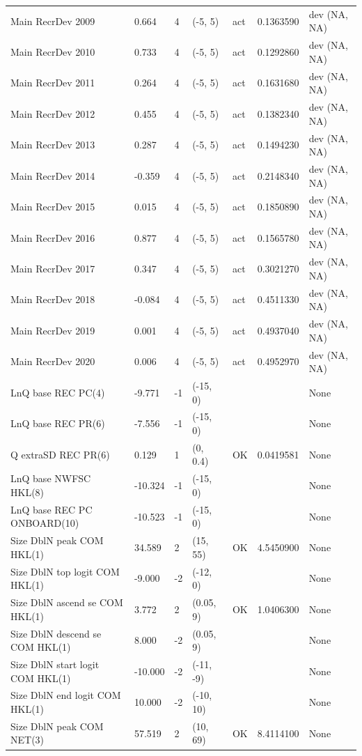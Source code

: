 \documentclass[11pt,
  english,
  a4paper,
]{article}
\begin{document}
\begin{landscape}
\begin{longtable}[t]{>{\raggedright\arraybackslash}p{8.5cm}lllll>{\raggedright\arraybackslash}p{4cm}}
Main RecrDev 2009 & 0.664 & 4 & (-5, 5) & act & 0.1363590 & dev (NA, NA)\\
Main RecrDev 2010 & 0.733 & 4 & (-5, 5) & act & 0.1292860 & dev (NA, NA)\\
Main RecrDev 2011 & 0.264 & 4 & (-5, 5) & act & 0.1631680 & dev (NA, NA)\\
Main RecrDev 2012 & 0.455 & 4 & (-5, 5) & act & 0.1382340 & dev (NA, NA)\\
Main RecrDev 2013 & 0.287 & 4 & (-5, 5) & act & 0.1494230 & dev (NA, NA)\\
Main RecrDev 2014 & -0.359 & 4 & (-5, 5) & act & 0.2148340 & dev (NA, NA)\\
Main RecrDev 2015 & 0.015 & 4 & (-5, 5) & act & 0.1850890 & dev (NA, NA)\\
Main RecrDev 2016 & 0.877 & 4 & (-5, 5) & act & 0.1565780 & dev (NA, NA)\\
Main RecrDev 2017 & 0.347 & 4 & (-5, 5) & act & 0.3021270 & dev (NA, NA)\\
Main RecrDev 2018 & -0.084 & 4 & (-5, 5) & act & 0.4511330 & dev (NA, NA)\\
Main RecrDev 2019 & 0.001 & 4 & (-5, 5) & act & 0.4937040 & dev (NA, NA)\\
Main RecrDev 2020 & 0.006 & 4 & (-5, 5) & act & 0.4952970 & dev (NA, NA)\\
LnQ base REC PC(4) & -9.771 & -1 & (-15, 0) &  &  & None\\
LnQ base REC PR(6) & -7.556 & -1 & (-15, 0) &  &  & None\\
Q extraSD REC PR(6) & 0.129 & 1 & (0, 0.4) & OK & 0.0419581 & None\\
LnQ base NWFSC HKL(8) & -10.324 & -1 & (-15, 0) &  &  & None\\
LnQ base REC PC ONBOARD(10) & -10.523 & -1 & (-15, 0) &  &  & None\\
Size DblN peak COM HKL(1) & 34.589 & 2 & (15, 55) & OK & 4.5450900 & None\\
Size DblN top logit COM HKL(1) & -9.000 & -2 & (-12, 0) &  &  & None\\
Size DblN ascend se COM HKL(1) & 3.772 & 2 & (0.05, 9) & OK & 1.0406300 & None\\
Size DblN descend se COM HKL(1) & 8.000 & -2 & (0.05, 9) &  &  & None\\
Size DblN start logit COM HKL(1) & -10.000 & -2 & (-11, -9) &  &  & None\\
Size DblN end logit COM HKL(1) & 10.000 & -2 & (-10, 10) &  &  & None\\
Size DblN peak COM NET(3) & 57.519 & 2 & (10, 69) & OK & 8.4114100 & None\\

\end{longtable}
\end{landscape}
\end{document}
